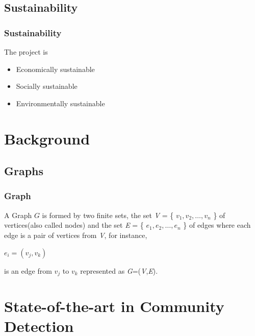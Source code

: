 \documentclass{beamer}
\begin{document}
\subsection{Sustainability}
\frame
{
\frametitle{Sustainability}
The project is 
\begin{itemize}
\item Economically sustainable
\item Socially sustainable
\item Environmentally sustainable
\end{itemize}
}
\section{Background}

\subsection[Few Theoretical Concepts]{Graphs}

\frame
{
	\frametitle{Graph}
\begin{theorem}
	A Graph $G$ is formed by two finite sets, the set \textit{V} = \{ $v_1,v_2, \ldots ,v_n$ \} of vertices(also called nodes) and the set \textit{E} = \{ $e_1,e_2, \ldots,e_n$  \} of edges where each edge is a pair of vertices from \textit{V}, for instance,
\begin{center}
$e_i = (v_j,v_k)$
\end{center}
is an edge from $v_j$ to $v_k$ represented as \textit{G}=(\textit{V},\textit{E}).
\end{theorem}
}

\section{State-of-the-art in Community Detection}
\end{document}
